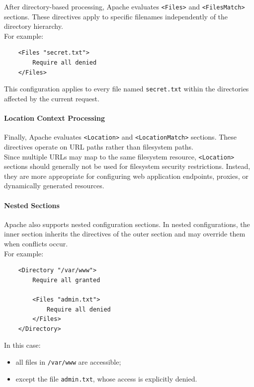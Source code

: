 \documentclass{scrbook}
\begin{document}
	After directory-based processing, Apache evaluates \texttt{<Files>} and \texttt{<FilesMatch>} sections. These directives apply to specific filenames independently of the directory hierarchy.\\
	
	For example:
	
	\begin{lstlisting}
	<Files "secret.txt">
		Require all denied
	</Files>
	\end{lstlisting}
	
	This configuration applies to every file named \texttt{secret.txt} within the directories affected by the current request.
	
	\paragraph{Location Context Processing}
	
	Finally, Apache evaluates \texttt{<Location>} and \texttt{<LocationMatch>} sections. These directives operate on URL paths rather than filesystem paths.\\
	
	Since multiple URLs may map to the same filesystem resource, \texttt{<Location>} sections should generally not be used for filesystem security restrictions. Instead, they are more appropriate for configuring web application endpoints, proxies, or dynamically generated resources.
	
	\paragraph{Nested Sections}
	
	Apache also supports nested configuration sections. In nested configurations, the inner section inherits the directives of the outer section and may override them when conflicts occur.\\
	
	For example:
	
	\begin{lstlisting}
	<Directory "/var/www">
		Require all granted
		
		<Files "admin.txt">
			Require all denied
		</Files>
	</Directory>
	\end{lstlisting}
	
	In this case:
	\begin{itemize}
		\item all files in \texttt{/var/www} are accessible;
		
		\item except the file \texttt{admin.txt}, whose access is explicitly denied.
	\end{itemize}
	
\end{document}
